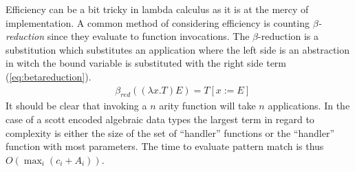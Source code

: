 \documentclass[11pt,oneside,a4paper]{report}
\begin{document}
Efficiency can be a bit tricky in lambda calculus as it is at the mercy of implementation.
A common method of considering efficiency is counting \textit{$\beta$-reduction} since they evaluate to function invocations.
The $\beta$-reduction is a substitution which substitutes an application where the left side is an abstraction in witch the bound variable is substituted with the right side term (\autoref{eq:betareduction}). 
\begin{align}
    &\beta_{red}((\lambda x . T) E) = T[x := E]
   \label{eq:betareduction}
\end{align}
It should be clear that invoking a $n$ arity function will take $n$ applications.
In the case of a scott encoded algebraic data types the largest term in regard to complexity is either the size of the set of ``handler'' functions or the ``handler'' function with most parameters.
The time to evaluate pattern match is thus $O(\max_i(c_i + A_i))$.
\end{document}
